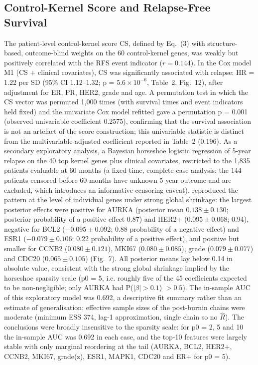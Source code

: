 \documentclass[12pt]{article}
\begin{document}
\subsection{Control-Kernel Score and Relapse-Free Survival}

The patient-level control-kernel score CS, defined by Eq.~(3) with
structure-based, outcome-blind weights on the 60 control-kernel genes, was
weakly but positively correlated with the RFS event indicator
($r = 0.144$). In the Cox model M1 (CS + clinical covariates), CS was
significantly associated with relapse: HR = 1.22 per SD (95\% CI 1.12--1.32;
p = $5.6\times10^{-6}$, Table~2, Fig.~12), after adjustment for ER, PR, HER2, grade
and age. A permutation test in which the CS vector was permuted 1,000 times
(with survival times and event indicators held fixed) and the univariate Cox
model refitted gave a permutation p = 0.001 (observed univariable
coefficient 0.2575), confirming that the survival association is not an
artefact of the score construction; this univariable statistic is distinct
from the multivariable-adjusted coefficient reported in Table~2 (0.196). As a
secondary exploratory analysis, a Bayesian horseshoe logistic regression of
5-year relapse on the 40 top kernel genes plus clinical covariates,
restricted to the 1,835 patients evaluable at 60 months (a fixed-time,
complete-case analysis: the 144 patients censored before 60 months have
unknown 5-year outcome and are excluded, which introduces an
informative-censoring caveat), reproduced the pattern at the level of
individual genes under strong global shrinkage: the largest posterior
effects were positive for AURKA (posterior mean $0.138 \pm 0.130$;
posterior probability of a positive effect 0.87) and HER2+
($0.095 \pm 0.068$; 0.94), negative for BCL2 ($-0.095 \pm 0.092$; 0.88
probability of a negative effect) and ESR1 ($-0.079 \pm 0.106$; 0.22
probability of a positive effect), and positive but smaller for CCNB2
($0.080 \pm 0.121$), MKI67 ($0.080 \pm 0.085$), grade ($0.079 \pm 0.077$)
and CDC20 ($0.065 \pm 0.105$) (Fig.~7). All posterior means lay below 0.14
in absolute value, consistent with the strong global shrinkage implied by
the horseshoe sparsity scale (p0 = 5, i.e. roughly five of the 45
coefficients expected to be non-negligible; only AURKA had
P($|\beta|>0.1$) $> 0.5$). The in-sample AUC of this exploratory model was
0.692, a descriptive fit summary rather than an estimate of generalisation;
effective sample sizes of the post-burnin chains were moderate (minimum
ESS 374, lag-1 approximation, single chain so no $\hat{R}$). The conclusions
were broadly insensitive to the sparsity scale: for p0 = 2, 5 and 10 the
in-sample AUC was 0.692 in each case, and the top-10 features were largely
stable with only marginal reordering at the tail (AURKA, BCL2, HER2+, CCNB2,
MKI67, grade(z), ESR1, MAPK1, CDC20 and ER+ for p0 = 5).
\end{document}

